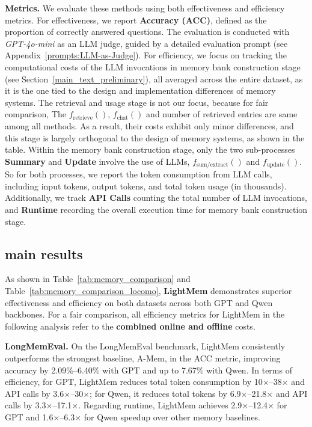 \noindent \textbf{Metrics.}
We evaluate these methods using both effectiveness and efficiency metrics. 
For effectiveness, we report \textbf{Accuracy (ACC)}, defined as the proportion of correctly answered questions. 
The evaluation is conducted with \emph{GPT-4o-mini} as an LLM judge, guided by a detailed evaluation prompt (see Appendix~\ref{prompts:LLM-as-Judge}). 
For efficiency, we focus on tracking the computational costs of the LLM invocations in memory bank construction stage (see Section~\ref{main_text_preliminary}), all averaged across the entire dataset, as it is the one tied to the design and implementation differences of memory systems. 
The retrieval and usage stage is not our focus, because for fair comparison, The $f_{\text{retrieve}}()$, $f_{\text{chat}}()$ and number of retrieved entries are same among all methods. As a result, their costs exhibit only minor differences, and this stage is largely orthogonal to the design of memory systems, as shown in the table. 
Within the memory bank construction stage, only the two sub-processes  \textbf{Summary} and \textbf{Update} involve the use of LLMs, $f_{\text{sum/extract}}()$ and $f_{\text{update}}()$. 
So for both processes, we report the token consumption from LLM calls, including input tokens, output tokens, and total token usage (in thousands). 
Additionally, we track \textbf{API Calls} counting the total number of LLM invocations, and \textbf{Runtime} recording the overall execution time for memory bank construction stage. 



\subsection{main results}

As shown in Table~\ref{tab:memory_comparison} and Table~\ref{tab:memory_comparison_locomo}, \textbf{LightMem} demonstrates superior effectiveness and efficiency on both datasets across both GPT and Qwen backbones. 
For a fair comparison, all efficiency metrics for LightMem in the following analysis refer to the \textbf{combined online and offline} costs.


\noindent \textbf{LongMemEval.} 
On the LongMemEval benchmark, LightMem consistently outperforms the strongest baseline, A-Mem, in the ACC metric, improving accuracy by 2.09\%--6.40\% with GPT and up to 7.67\% with Qwen. In terms of efficiency, for GPT, LightMem reduces total token consumption by 10$\times$--38$\times$ and API calls by 3.6$\times$--30$\times$; for Qwen, it reduces total tokens by 6.9$\times$--21.8$\times$ and API calls by 3.3$\times$--17.1$\times$. Regarding runtime, LightMem achieves 2.9$\times$--12.4$\times$ for GPT and 1.6$\times$--6.3$\times$ for Qwen speedup over other memory baselines. 

